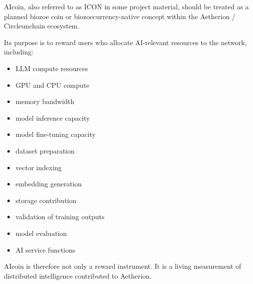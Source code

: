 ﻿\documentclass[12pt]{article}
\begin{document}
AIcoin, also referred to as ICON in some project material, should be treated as a planned biozoe coin or biozoecurrency-native concept within the Aetherion / Circleunchain ecosystem.

Its purpose is to reward users who allocate AI-relevant resources to the network, including:

\begin{itemize}
  \item LLM compute resources
\end{itemize}
\begin{itemize}
  \item GPU and CPU compute
\end{itemize}
\begin{itemize}
  \item memory bandwidth
\end{itemize}
\begin{itemize}
  \item model inference capacity
\end{itemize}
\begin{itemize}
  \item model fine-tuning capacity
\end{itemize}
\begin{itemize}
  \item dataset preparation
\end{itemize}
\begin{itemize}
  \item vector indexing
\end{itemize}
\begin{itemize}
  \item embedding generation
\end{itemize}
\begin{itemize}
  \item storage contribution
\end{itemize}
\begin{itemize}
  \item validation of training outputs
\end{itemize}
\begin{itemize}
  \item model evaluation
\end{itemize}
\begin{itemize}
  \item AI service functions
\end{itemize}

AIcoin is therefore not only a reward instrument. It is a living measurement of distributed intelligence contributed to Aetherion.
\end{document}
